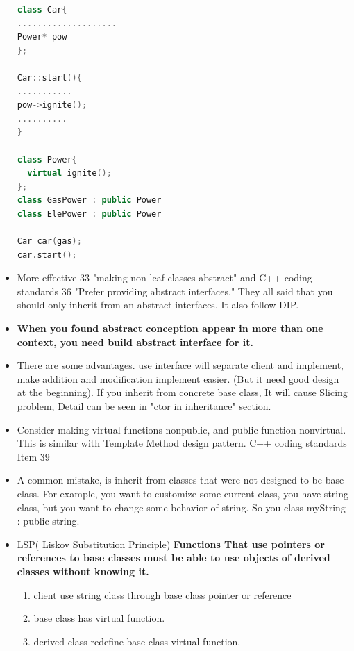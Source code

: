 \documentclass[a4paper,12pt,twoside]{book}
\begin{document}
\begin{itemize}
\begin{lstlisting}[frame=single, language=c++]
class Car{
....................
Power* pow
};

Car::start(){
...........
pow->ignite();
..........
}

class Power{
  virtual ignite();
};
class GasPower : public Power
class ElePower : public Power

Car car(gas);
car.start();
\end{lstlisting}

\item More effective 33 "making non-leaf classes abstract" and C++ coding standards 36 "Prefer providing abstract interfaces."	 They all said that you should only inherit from an abstract interfaces. It also follow DIP.

\item \textbf{When you found abstract conception appear in more than one context, you need build abstract interface for it. }

\item There are some advantages. use interface will separate client and implement, make addition and modification implement easier. (But it need good design at the beginning). If you inherit from concrete base class, It will cause Slicing problem, Detail can be seen in "ctor in inheritance" section.

\item Consider making virtual functions nonpublic, and public function nonvirtual. This is similar with Template Method design pattern.  C++ coding standards Item 39


\item  A common mistake, is inherit from classes that were not designed to be base class. For example, you want to customize some current class, you have string class, but you want to change some behavior of string. So you class myString : public string.

\item LSP( Liskov Substitution Principle) \textbf{Functions That use pointers or references to base classes must be able to use objects of derived classes without knowing it. }
\begin{enumerate}
\item client use string class through base class pointer or reference
\item base class has virtual function.
\item derived class redefine base class virtual function.
\end{enumerate}


\end{itemize}
\end{document}
